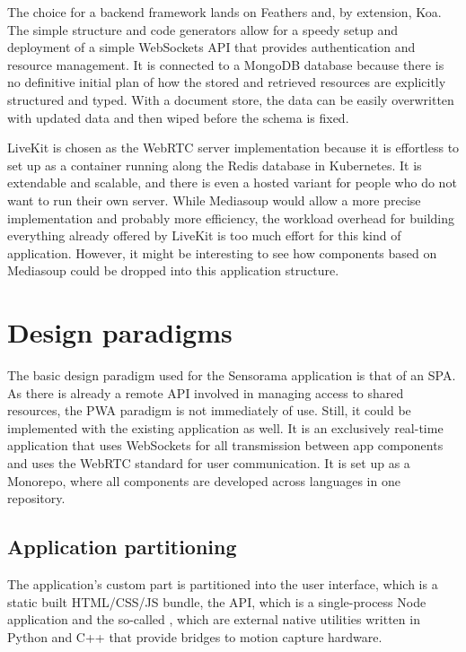 The choice for a backend framework lands on Feathers and, by extension, Koa.
The simple structure and code generators allow for a speedy setup and deployment of a simple WebSockets \ac{API} that provides authentication and resource management.
It is connected to a MongoDB database because there is no definitive initial plan of how the stored and retrieved resources are explicitly structured and typed.
With a document store, the data can be easily overwritten with updated data and then wiped before the schema is fixed.

LiveKit is chosen as the WebRTC server implementation because it is effortless to set up as a container running along the Redis database in Kubernetes.
It is extendable and scalable, and there is even a hosted variant for people who do not want to run their own server.
While Mediasoup would allow a more precise implementation and probably more efficiency, the workload overhead for building everything already offered by LiveKit is too much effort for this kind of application.
However, it might be interesting to see how components based on Mediasoup could be dropped into this application structure.

\section{Design paradigms}
\label{sec:design-paradigms}

The basic design paradigm used for the Sensorama application is that of an \ac{SPA}.
As there is already a remote API involved in managing access to shared resources, the \ac{PWA} paradigm is not immediately of use.
Still, it could be implemented with the existing application as well.
It is an exclusively real-time application that uses WebSockets for all transmission between app components and uses the WebRTC standard for user communication.
It is set up as a Monorepo, where all components are developed across languages in one repository.

\subsection{Application partitioning}

The application's custom part is partitioned into the user interface, which is a static built \ac{HTML}/\ac{CSS}/\ac{JS} bundle, the \ac{API}, which is a single-process Node application and the so-called , which are external native utilities written in Python and C++ that provide bridges to motion capture hardware.

